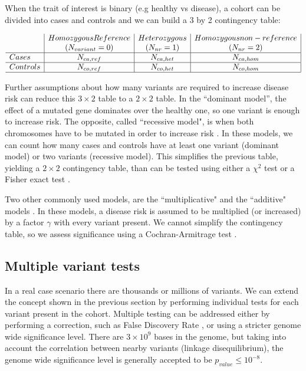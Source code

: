 When the trait of interest is binary (e.g healthy vs disease), a cohort can be divided into cases and controls and we can build a 3 by 2 contingency table:

\[
\begin{array}{l|c|c|c|}
	& Homozygous Reference & Heterozygous & Homozygous non-reference\\
	& (N_{variant} = 0) & (N_{nr} = 1) & (N_{nr} = 2) \\
    \hline 
    Cases & N_{ca,ref} & N_{ca,het} & N_{ca,hom} \\ 
    \hline 
    Controls & N_{co,ref} & N_{co,het} & N_{co,hom} \\
    \hline 
\end{array} 
\]

Further assumptions about how many variants are required to increase disease risk can reduce this $3 \times 2$ table to a $2 \times 2$ table. In the ``dominant model'', the effect of a mutated gene dominates over the healthy one, so one variant is enough to increase risk. The opposite, called ``recessive model", is when both chromosomes have to be mutated in order to increase risk \cite{balding2006tutorial, clarke2011basic}. In these models, we can count how many cases and controls have at least one variant (dominant model) or two variants (recessive model). This simplifies the previous table, yielding a $2 \times 2$ contingency table, than can be tested using either a $\chi^2$ test or a Fisher exact test \cite{balding2006tutorial}.

Two other commonly used models, are the ``multiplicative" and the ``additive" models \cite{balding2006tutorial,clarke2011basic}. In these models, a disease risk is assumed to be multiplied (or increased) by a factor $\gamma$ with every variant present. We cannot simplify the contingency table, so we assess significance using a Cochran-Armitrage test \cite{clarke2011basic}.

\subsection{Multiple variant tests}

In a real case scenario there are thousands or millions of variants. We can extend the concept shown in the previous section by performing individual tests for each variant present in the cohort. Multiple testing can be addressed either by performing a correction, such as False Discovery Rate \cite{balding2006tutorial, clarke2011basic}, or using a stricter genome wide significance level. There are $3 \times 10^9$ bases in the genome, but taking into account the correlation between nearby variants (linkage disequilibrium), the genome wide significance level is generally accepted to be $p_{value} \leq 10^{-8}$.

